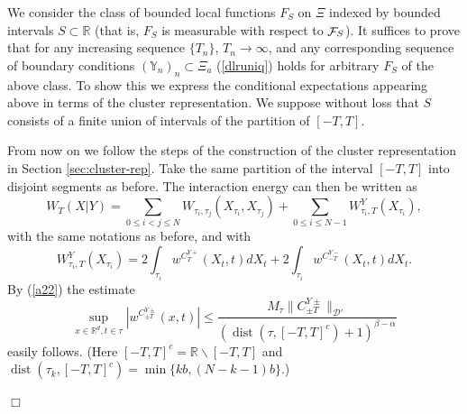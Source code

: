 \documentclass[a4paper,11pt]{article}
\newenvironment{proof}[1][Proof]{{\sc #1.} }{\hfill $\Box$}
\newcommand{\dist}{\mathop{\mathrm{dist}}\nolimits}
\newcommand{\smallsetminus}{\backslash}
\newcommand{\R}{\mathbb{R}}
\newcommand{\YY}{\mathbb{Y}}
\newcommand{\F}{\mathop{\mathrm{{\cal F}}}\nolimits}
\begin{document}
\begin{proof}
We consider the class of bounded local functions $F_S$ on $\Xi$ indexed 
by bounded intervals $S \subset \R$ (that is, $F_S$ is measurable with 
respect to $\F_S$). It suffices to prove that for any increasing sequence 
$\{T_n\}$, $T_n \to \infty$, and any corresponding sequence of boundary 
conditions $(\YY_n)_n \subset \Xi_a$ (\ref{dlruniq}) holds for arbitrary 
$F_S$ of the above class. To show this we express the conditional 
expectations appearing above in terms of the cluster representation. We 
suppose without loss that $S$ consists of a finite union of intervals of 
the partition of $[-T,T]$. 

From now on we follow the steps of the construction of the cluster
representation in Section \ref{sec:cluster-rep}. Take the same partition 
of the interval $[-T,T]$ into disjoint segments as before. The interaction 
energy can then be written as
%
\begin{equation}
W_T(X|Y) = 
\sum_{0 \leq i < j \leq N} W_{\tau_i,\tau_j}(X_{\tau_i},X_{\tau_j}) + 
\sum_{0 \leq i \leq N-1} W_{\tau_i,T}^Y (X_{\tau_i}),
\end{equation}
with the same notations as before, and with 
%
\begin{equation}
W_{\tau_i,T}^Y (X_{\tau_i}) = 2 \int_{\tau_i}w^{C^{Y +}_{T}}(X_t,t) dX_t + 
2\int_{\tau_i}  w^{C^{Y-}_{-T}}(X_t,t) dX_t.   
\end{equation}
By (\ref{a22}) the estimate 
%
\begin{equation}
\label{a22y}
\sup_{x\in \R^d, t \in \tau} |w^{C^{Y \pm}_{\pm T}}(x,t)| 
\leq 
\frac{M_\tau \|C^{Y \pm}_{\pm T}\|_{\mathcal{D}'}}
{\left(\dist(\tau,[-T,T]^c) + 1 \right)^{\beta-\alpha}}
\end{equation}
easily follows. (Here $[-T,T]^c = \R \smallsetminus [-T,T]$ and 
$\dist(\tau_k,[-T,T]^c) = \min \{kb, (N-k-1)b\}$.) 


\end{proof}
\end{document}
